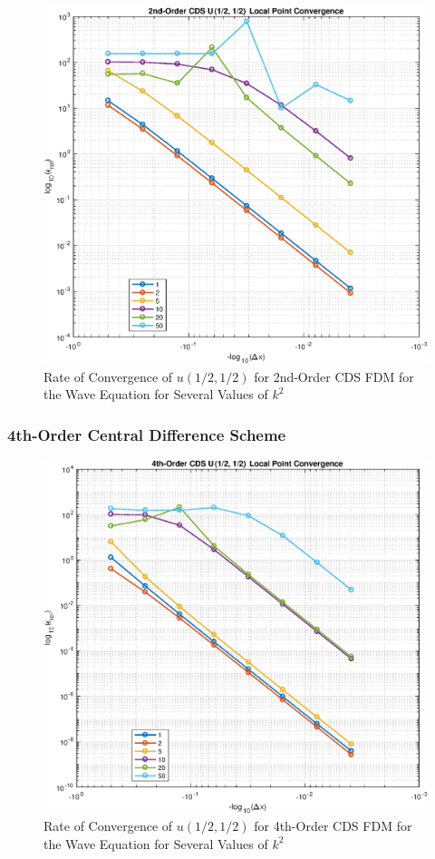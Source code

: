 \documentclass[10pt]{article}		%
\numberwithin{equation}{section}
\begin{document}
\begin{figure}[H]
	\begin{center}
		\includegraphics[width = 0.8\linewidth]{plus_order_2_u_avg}
		\caption{Rate of Convergence of $u(1/2, 1/2)$ for 2nd-Order CDS FDM for the Wave Equation for Several Values of $k^2$}	
	\end{center}
\end{figure}

\begin{table}[H]
	
\end{table}

\newpage

\subsubsection{4th-Order Central Difference Scheme}

\begin{figure}[H]
	\begin{center}
		\includegraphics[width = 0.8\linewidth]{plus_order_4_u_avg}
		\caption{Rate of Convergence of $u(1/2, 1/2)$ for 4th-Order CDS FDM for the Wave Equation for Several Values of $k^2$}	
	\end{center}
\end{figure}
\end{document}
